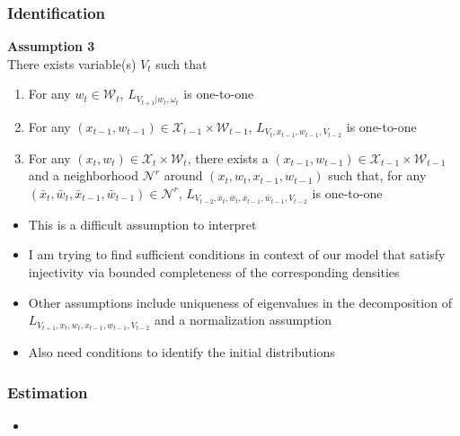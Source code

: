 \documentclass{beamer}
\begin{document}
\begin{frame}
\frametitle{Identification}
\textbf{Assumption 3}\\
There exists variable(s) $V_{t}$ such that
    \begin{enumerate}
    \item For any $w_{t}\in \mathcal{W}_{t}$, $L_{V_{t+1}|w_{t}, \omega_{t}}$ is one-to-one
    \item For any $(x_{t-1}, w_{t-1})\in \mathcal{X}_{t-1}\times\mathcal{W}_{t-1}$, $L_{V_{t}, x_{t-1}, w_{t-1}, V_{t-2}}$ is one-to-one
    \item For any $(x_{t}, w_{t})\in \mathcal{X}_{t}\times\mathcal{W}_{t}$, there exists a $(x_{t-1}, w_{t-1})\in \mathcal{X}_{t-1}\times\mathcal{W}_{t-1}$ and a neighborhood $\mathcal{N}^{r}$ around $(x_{t}, w_{t}, x_{t-1}, w_{t-1})$ such that, for any $(\bar{x}_{t}, \bar{w}_{t}, \bar{x}_{t-1}, \bar{w}_{t-1})\in \mathcal{N}^{r}$, $L_{V_{t-2}, \bar{x}_{t}, \bar{w}_{t}, \bar{x}_{t-1}, \bar{w}_{t-1}, V_{t-2}}$ is one-to-one
    \end{enumerate}
\begin{itemize}
	\item This is a difficult assumption to interpret
	\item I am trying to find sufficient conditions in context of our model that satisfy injectivity via bounded completeness of the corresponding densities
	\item Other assumptions include uniqueness of eigenvalues in the decomposition of $L_{V_{t+1},x_{t},w_{t},x_{t-1}, w_{t-1}, V_{t-2}}$ and a normalization assumption
	\item Also need conditions to identify the initial distributions
\end{itemize}
\end{frame}

\begin{frame}
\frametitle{Estimation}
\begin{itemize}
\item 
\end{itemize}
\end{frame}
\end{document}
